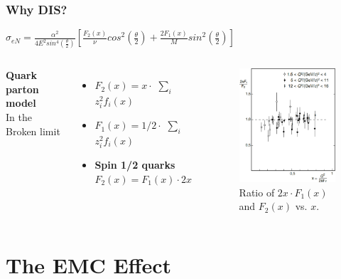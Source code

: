 \documentclass[12pt,usenames,dvipsnames]{beamer}
\begin{document}
\begin{frame}
\frametitle{Why DIS?}
\vspace*{-15pt}
\centering
\large	$\sigma_{eN} = \frac{\alpha^2}{4E^2sin^4(\frac{\theta}{2})} [\frac{F_2(x)}{\nu}cos^2\left(\frac{\theta}{2}\right) + \frac{2F_1(x)}{M}sin^2\left(\frac{\theta}{2}\right)] $

\begin{columns}[c] %
	\textbf{Quark parton model}\\
	In the Broken limit
\begin{itemize}
	\item $F_2(x) = x \cdot$ $\sum_{i}$ $z_i^2f_i(x) $
	\item $F_1(x) = 1/2 \cdot$ $\sum_{i}$ $z_i^2f_i(x)$
	\item  \textbf{Spin 1/2 quarks} $F_2(x) = F_1(x) \cdot2x$
\end{itemize}



\vspace*{-5pt}
\begin{figure}[t]
	\centering
	\includegraphics[width=4.5cm]{../images/Thesis/f1_f2_spin.pdf} 
	\caption*{Ratio of $2x\cdot F_1(x)$ and $F_2(x)$ vs. $x$. \cite{PnN}}
	
\end{figure}  
\end{columns}
\end{frame}

\section[EMC]{The EMC Effect}
\end{document}
